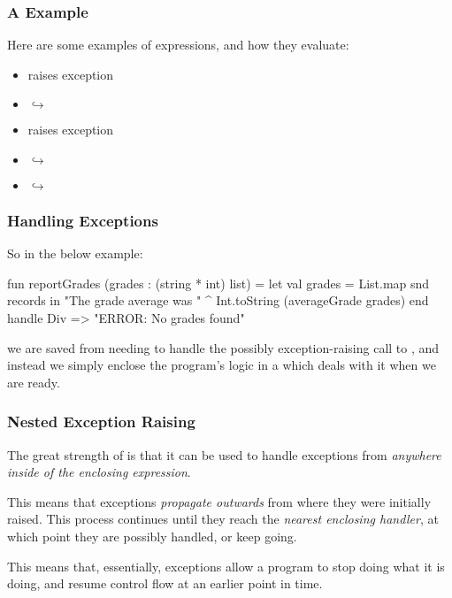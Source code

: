\documentclass[aspectratio=169]{beamer}
\begin{document}
\begin{frame}[fragile]
  \frametitle{A  Example}

  Here are some examples of  expressions, and how they evaluate:

  \vspace{\fill}

  \begin{itemize}
    \item {} raises exception 
    \item {} $\hookrightarrow$  
    \item {} raises exception  
    \item {} $\hookrightarrow$  
    \item {} $\hookrightarrow$ 
  \end{itemize}

\end{frame}

\begin{frame}[fragile]
  \frametitle{Handling Exceptions}

  So in the below example:

  \begin{codeblock}
    fun reportGrades (grades : (string * int) list) =
      let
        val grades = List.map snd records
      in
        "The grade average was " ^ Int.toString (averageGrade grades) 
      end
      handle Div => "ERROR: No grades found" 
  \end{codeblock}

  we are saved from needing to handle the possibly exception-raising call to
  , and instead we simply enclose the program's
  logic in a  which deals with it when we are ready.
\end{frame}

\begin{frame}[fragile]
  \frametitle{Nested Exception Raising}

  The great strength of  is that it can be used to handle
  exceptions from \textit{anywhere inside of the enclosing expression}.
  
  \vspace{\fill}


  \vspace{\fill}

  This means that exceptions \textit{propagate outwards} from where
  they were initially raised. This process continues until they reach
  the \textit{nearest enclosing handler}, at which point they are
  possibly handled, or keep going.

  \vspace{\fill}

  This means that, essentially, exceptions allow a program to stop
  doing what it is doing, and resume control flow at an earlier point
  in time.
\end{frame}
\end{document}
